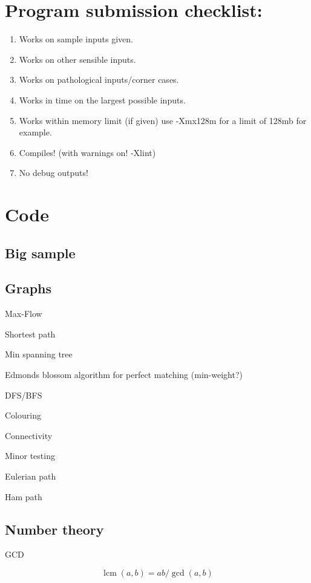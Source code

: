 \documentclass[10pt,a4paper]{article}
\newcommand{\codelisting}[1]{
  }
\DeclareMathOperator{\lcm}{lcm}
\begin{document}
\maketitle
\thispagestyle{myheadings}
\section*{Program submission checklist:}
\begin{enumerate}
\item Works on sample inputs given.
\item Works on other sensible inputs.
\item Works on pathological inputs/corner cases.
\item Works in time on the largest possible inputs.
\item Works within memory limit (if given) use -Xmx128m for a limit of 128mb for example.
\item Compiles! (with warnings on! -Xlint)
\item No debug outputs!
\end{enumerate}
\section*{Code}
\subsection*{Big sample}


\subsection*{Graphs}
\codelisting{Graph.java}

Max-Flow
\codelisting{fordfulkerson.java}

Shortest path
\codelisting{shortpath.java}

Min spanning tree
\codelisting{kruskal.java}

Edmonds blossom algorithm for perfect matching (min-weight?)
\codelisting{blossom.java}

DFS/BFS
\codelisting{search.java}

Colouring

Connectivity

Minor testing

Eulerian path

Ham path

\subsection*{Number theory}
GCD
\codelisting{gcd.java}
\[\lcm(a,b) = ab/\gcd(a,b)\]
\end{document}
